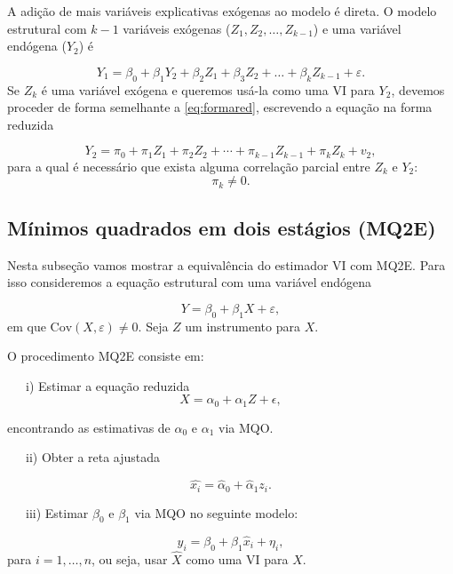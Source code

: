 \documentclass[
]{book}
\theoremstyle{definition}
\theoremstyle{definition}
\theoremstyle{definition}
\theoremstyle{remark}
\begin{document}
A adição de mais variáveis explicativas exógenas ao modelo é direta. O modelo estrutural com \(k-1\) variáveis exógenas (\(Z_1,Z_2,\ldots,Z_{k-1}\)) e uma variável endógena (\(Y_2\)) é

\begin{equation}
 Y_1=\beta_0+\beta_1Y_2+\beta_2Z_1+\beta_3Z_2+\ldots+\beta_kZ_{k-1}+\varepsilon.
  \label{eq:fromaestvv}
\end{equation}
Se \(Z_k\) é uma variável exógena e queremos usá-la como uma VI para \(Y_2\), devemos
proceder de forma semelhante a \eqref{eq:formared}, escrevendo a equação na forma reduzida

\begin{equation}
 Y_2=\pi_0+\pi_1Z_1+\pi_2Z_2+\cdots+\pi_{k-1}Z_{k-1}+\pi_kZ_k+v_2,
 \label{eq:fromaredvv}
\end{equation}
para a qual é necessário que exista alguma correlação parcial entre \(Z_k\) e \(Y_2\):
\[\pi_k\neq 0.\]

\hypertarget{muxednimos-quadrados-em-dois-estuxe1gios-mq2e}{%
\subsection{Mínimos quadrados em dois estágios (MQ2E)}\label{muxednimos-quadrados-em-dois-estuxe1gios-mq2e}}

Nesta subseção vamos mostrar a equivalência do estimador VI com MQ2E. Para isso
consideremos a equação estrutural com uma variável endógena

\begin{equation}
Y=\beta_0+\beta_1 X  +\varepsilon,
\label{eq:mq2e1}
\end{equation}
em que \(\mbox{Cov}(X,\varepsilon)\neq 0\). Seja \(Z\) um instrumento para \(X\).

O procedimento MQ2E consiste em:

~~~i) Estimar a equação reduzida \begin{equation}    X=\alpha_0+\alpha_1 Z  +\epsilon,    \label{eq:mq2e2}   \end{equation}

encontrando as estimativas de \(\alpha_0\) e \(\alpha_1\) via MQO.

~~~ii) Obter a reta ajustada

\[    \hat{x_i}=\hat{\alpha}_0+\hat{\alpha}_1 z_i.\]

~~~iii) Estimar \(\beta_0\) e \(\beta_1\) via MQO no seguinte modelo:

\begin{equation}
 y_i=\beta_0+\beta_1 \hat{x}_i  +\eta_i,
 \label{eq:yhatx}
\end{equation}
para \(i=1,\ldots,n\), ou seja, usar \(\hat{X}\) como uma VI para \(X\).
\end{document}
